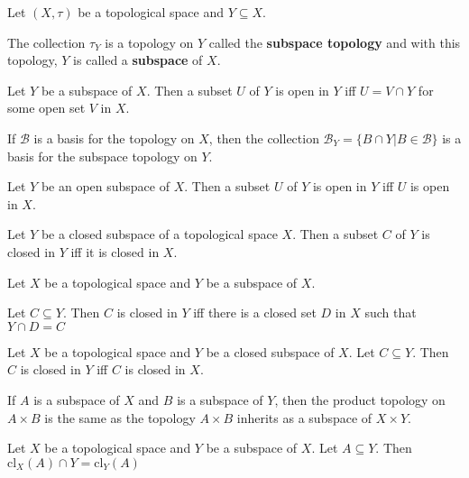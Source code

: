 \begin{defn}
    Let $(X, \tau)$ be a topological space and $Y \subseteq X$.
    
    The collection $\tau_Y$ is a topology on $Y$ called the \textbf{subspace topology} and with this topology, $Y$ is called a \textbf{subspace} of $X$.
\end{defn}

\begin{thm}
    Let $Y$ be a subspace of $X$. Then a subset $U$ of $Y$ is open in $Y$ iff $U = V \cap Y$ for some open set $V$ in $X$.
\end{thm}

\begin{thm}
    If $\mathscr{B}$ is a basis for the topology on $X$, then the collection $\mathscr{B}_Y = \{ B \cap Y  | B \in \mathscr{B} \}$ is a basis for the subspace topology on $Y$.
\end{thm}



\begin{thm}
    Let $Y$ be an open subspace of $X$. Then a subset $U$ of $Y$ is open in $Y$ iff $U$ is open in $X$.
\end{thm}

\begin{thm}
    Let $Y$ be a closed subspace of a topological space $X$. Then a subset $C$ of $Y$ is closed in $Y$ iff it is closed in $X$.
\end{thm}

\begin{thm}
    Let $X$ be a topological space and $Y$ be a subspace of $X$.

    Let $C \subseteq Y$. Then $C$ is closed in $Y$ iff there is a closed set $D$ in $X$ such that $Y \cap D = C$
\end{thm}

\begin{thm}
    Let $X$ be a topological space and $Y$ be a closed subspace of $X$. Let $C \subseteq Y$. Then $C$ is closed in $Y$ iff $C$ is closed in $X$.
\end{thm}

\begin{thm}
    If $A$ is a subspace of $X$ and $B$ is a subspace of $Y$, then the product topology on $A \times B$ is the same as the topology $A \times B$ inherits as a subspace of $X \times Y$.
\end{thm}

\begin{thm}
    Let $X$ be a topological space and $Y$ be a subspace of $X$. Let $A \subseteq Y$. Then $\text{cl}_X(A) \cap Y = \text{cl}_Y(A)$
\end{thm}

\hhrule
